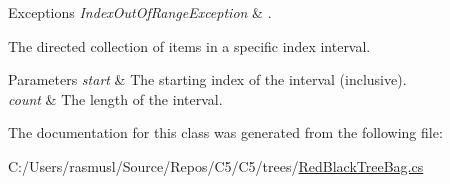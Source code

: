 \begin{DoxyExceptions}{Exceptions}
{\em Index\+Out\+Of\+Range\+Exception} & . \\
\hline
\end{DoxyExceptions}


The directed collection of items in a specific index interval.


\begin{DoxyParams}{Parameters}
{\em start} & The starting index of the interval (inclusive).\\
\hline
{\em count} & The length of the interval.\\
\hline
\end{DoxyParams}


The documentation for this class was generated from the following file\+:\begin{DoxyCompactItemize}
\item 
C\+:/\+Users/rasmusl/\+Source/\+Repos/\+C5/\+C5/trees/\hyperlink{_red_black_tree_bag_8cs}{Red\+Black\+Tree\+Bag.\+cs}\end{DoxyCompactItemize}
